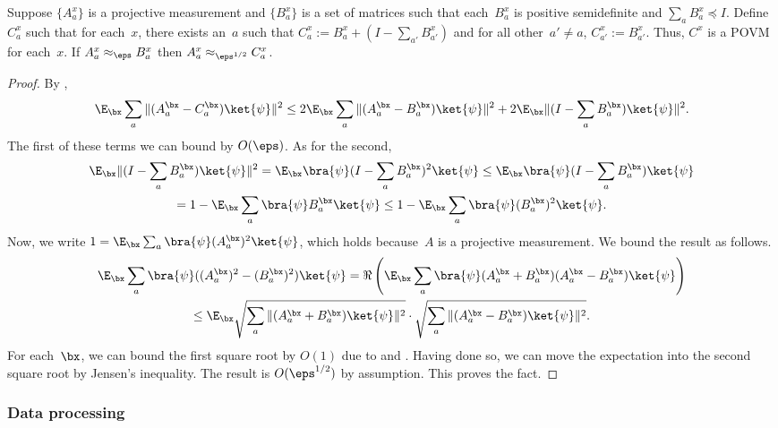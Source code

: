 \begin{fact}\label{fact:sub-zero}
Suppose $\{A^x_a\}$ is a projective measurement and $\{B^x_a\}$ is a set of matrices such that
each~$B^x_a$ is positive semidefinite
and $\sum_{a}B^x_a \preceq I$.
Define $C^x_a$ such that for each~$x$, there exists an~$a$ such that $C^x_a := B^x_a + (I - \sum_{a'} B^x_{a'})$
and for all other~$a' \neq a$, $C^x_{a'} := B^x_{a'}$.
Thus, $C^x$ is a POVM for each~$x$.
If $A^x_a \approx_{\eps} B^x_a$ then $A^x_a \approx_{\eps^{1/2}} C^x_a$.
\end{fact}
\begin{proof}
By ,
\begin{equation*}
\E_{\bx} \sum_a \Vert (A^{\bx}_a - C^{\bx}_a) \ket{\psi} \Vert^2
\leq 2\E_{\bx} \sum_a \Vert (A^{\bx}_a - B^{\bx}_a) \ket{\psi} \Vert^2 + 2 \E_{\bx}\Vert (I - \sum_a B^{\bx}_a) \ket{\psi}\Vert^2.
\end{equation*}
The first of these terms we can bound by $O(\eps)$.  As for the second, 
\begin{multline*}
\E_{\bx}\Vert (I - \sum_a B^{\bx}_a) \ket{\psi}\Vert^2
= \E_{\bx} \bra{\psi} (I-\sum_a B^{\bx}_a)^2 \ket{\psi}
\leq \E_{\bx} \bra{\psi} (I-\sum_a B^{\bx}_a) \ket{\psi}\\
= 1- \E_{\bx} \sum_a\bra{\psi}  B^{\bx}_a \ket{\psi}
\leq1- \E_{\bx} \sum_a\bra{\psi}  (B^{\bx}_a)^2 \ket{\psi}.
\end{multline*}
Now, we write $1 = \E_{\bx} \sum_a \bra{\psi} (A^{\bx}_a)^2 \ket{\psi}$,
which holds because~$A$ is a projective measurement.
We bound the result as follows.
\begin{multline*}
\E_{\bx} \sum_a \bra{\psi} ((A^{\bx}_a)^2  - (B^{\bx}_a)^2)\ket{\psi}
= \Re\left(\E_{\bx} \sum_a \bra{\psi} (A^{\bx}_a  + B^{\bx}_a)(A^{\bx}_a - B^{\bx}_a)\ket{\psi}\right)\\
\leq \E_{\bx} \sqrt{\sum_a \Vert (A^{\bx}_a + B^{\bx}_a) \ket{\psi}\Vert^2}
	\cdot \sqrt{\sum_a \Vert (A^{\bx}_a - B^{\bx}_a)\ket{\psi} \Vert^2}.
\end{multline*}
For each~$\bx$,
we can bound the first square root by $O(1)$
due to  and .
Having done so, we can move the expectation into the second square root by Jensen's inequality.
The result is $O(\eps^{1/2})$ by assumption. This proves the fact.
\end{proof}

\subsubsection{Data processing}

